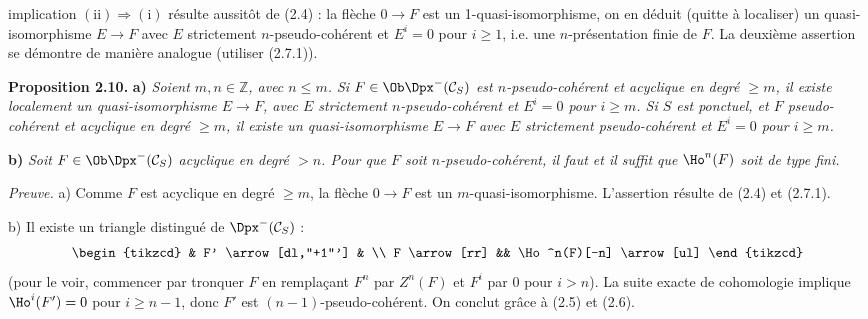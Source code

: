 implication \((\mathrm{ii})\Rightarrow(\mathrm{i})\) résulte aussitôt de (2.4) : la flèche \(0\to F\) est un 1-quasi-isomorphisme, on en déduit (quitte à localiser) un quasi-isomorphisme \(E\longrightarrow F\) avec \(E\) strictement \(n\)-pseudo-cohérent et \(E^i=0\) pour \(i\geq 1\), i.e. une \(n\)-présentation finie de \(F\). La deuxième assertion se démontre de manière analogue (utiliser (2.7.1)).

\textbf{Proposition 2.10.} \textbf{a)} \emph{Soient \(m,n\in\mathbb Z\), avec \(n\leq m\). Si \(F\in\Ob\Dpx^-(\mathcal C_S)\) est \(n\)-pseudo-cohérent et acyclique en degré \(\geq m\), il existe localement un quasi-isomorphisme \(E\longrightarrow F\), avec \(E\) strictement \(n\)-pseudo-cohérent et \(E^i=0\) pour \(i\geq m\). Si \(S\) est ponctuel, et \(F\) pseudo-cohérent et acyclique en degré \(\geq m\), il existe un quasi-isomorphisme \(E\longrightarrow F\) avec \(E\) strictement pseudo-cohérent et \(E^i=0\) pour \(i\geq m\).}

\textbf{b)} \emph{Soit \(F\in\Ob\Dpx^-(\mathcal C_S)\) acyclique en degré \(>n\). Pour que \(F\) soit \(n\)-pseudo-cohérent, il faut et il suffit que \(\Ho^n(F)\) soit de type fini.}

\emph{Preuve.} a) Comme \(F\) est acyclique en degré \(\geq m\), la flèche \(0\to F\) est un \(m\)-quasi-isomorphisme. L'assertion résulte de (2.4) et (2.7.1).

b) Il existe un triangle distingué de \(\Dpx^-(\mathcal C_S)\) :
\[
\begin{tikzcd}
& F' \arrow[dl,"+1"'] & \\
F \arrow[rr] && \Ho^n(F)[-n] \arrow[ul]
\end{tikzcd}
\]
(pour le voir, commencer par tronquer \(F\) en remplaçant \(F^n\) par \(Z^n(F)\) et \(F^i\) par \(0\) pour \(i>n\)). La suite exacte de cohomologie implique \(\Ho^i(F')=0\) pour \(i\geq n-1\), donc \(F'\) est \((n-1)\)-pseudo-cohérent. On conclut grâce à (2.5) et (2.6).



\providecommand{\RHom}{\mathrm R\!\Hom}
\providecommand{\Ext}{\operatorname{Ext}}
\providecommand{\coh}{\operatorname{coh}}
\providecommand{\PreCoh}{\operatorname{precoh}}
\providecommand{\Tr}{\operatorname{Tr}}
\providecommand{\Qis}{\operatorname{Qis}}
\providecommand{\Rad}{\operatorname{rad}}
\providecommand{\Spec}{\operatorname{Spec}}
\providecommand{\End}{\operatorname{End}}
\providecommand{\Id}{\operatorname{Id}}
\providecommand{\varinjlim}{\mathop{\mathrm{lim}}\limits_{\longrightarrow}}
\providecommand{\varprojlim}{\mathop{\mathrm{lim}}\limits_{\longleftarrow}}
\providecommand{\qcoh}{\operatorname{qcoh}}
\providecommand{\amp}{\operatorname{amp}}


